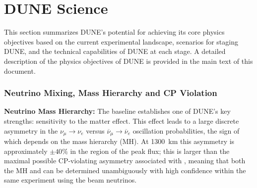 
\chapter{DUNE Science}
\label{v1ch:science}


This section summarizes DUNE's potential for achieving its core
physics objectives based on the current %
experimental landscape, scenarios for staging DUNE, and 
the technical capabilities of DUNE at each stage.
A detailed description of the physics objectives of DUNE is provided in
the main text of this document. 


\subsection{Neutrino Mixing, Mass Hierarchy and CP Violation}


\textbf{Neutrino Mass Hierarchy:} The  baseline
establishes one of DUNE's key strengths: sensitivity to the matter
effect. This effect leads to a large discrete asymmetry in the
$\nu_\mu\to \nu_e$ versus $\overline{\nu}_\mu \to \overline{\nu}_e$
oscillation probabilities, the sign of which depends on the mass
hierarchy (MH).  At 1300~km this asymmetry is approximately
$\pm 40\%$ in the region of the peak flux; this is larger than the
maximal possible CP-violating asymmetry associated with \deltacp,
meaning that both the MH and \deltacp can be
determined unambiguously with high confidence within the same
experiment using the beam neutrinos.

